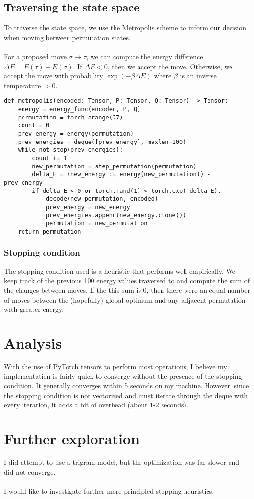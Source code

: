 \documentclass[11pt]{article}
\begin{document}
\subsection{Traversing the state space}
To traverse the state space, we use the Metropolis scheme to inform our decision when moving between permutation states.
\\\\
For a proposed move $\sigma \mapsto \tau$, we can compute the energy difference $\Delta E = E(\tau) - E(\sigma)$. If $\Delta E < 0$, then we accept the move. Otherwise, we accept the move with probability $\exp(-\beta\Delta E)$ where $\beta$ is an inverse temperature $> 0$.
\begin{verbatim}
def metropolis(encoded: Tensor, P: Tensor, Q: Tensor) -> Tensor:
    energy = energy_func(encoded, P, Q)
    permutation = torch.arange(27)
    count = 0
    prev_energy = energy(permutation)
    prev_energies = deque([prev_energy], maxlen=100)
    while not stop(prev_energies):
        count += 1
        new_permutation = step_permutation(permutation)
        delta_E = (new_energy := energy(new_permutation)) - prev_energy
        if delta_E < 0 or torch.rand(1) < torch.exp(-delta_E):
            decode(new_permutation, encoded)
            prev_energy = new_energy
            prev_energies.append(new_energy.clone())
            permutation = new_permutation
    return permutation
\end{verbatim}

\subsubsection{Stopping condition}
The stopping condition used is a heuristic that performs well empirically. We keep track of the previous 100 energy values traversed to and compute the sum of the changes between moves. If the this sum is 0, then there were an equal number of moves between the (hopefully) global optimum and any adjacent permutation with greater energy.

\pagebreak

\section{Analysis}
With the use of PyTorch tensors to perform most operations, I believe my implementation is fairly quick to converge without the presence of the stopping condition. It generally converges within 5 seconds on my machine. However, since the stopping condition is not vectorized and must iterate through the deque with every iteration, it adds a bit of overhead (about 1-2 seconds).

\pagebreak

\section{Further exploration}
I did attempt to use a trigram model, but the optimization was far slower and did not converge.
\\\\
I would like to investigate further more principled stopping heuristics.
\end{document}
